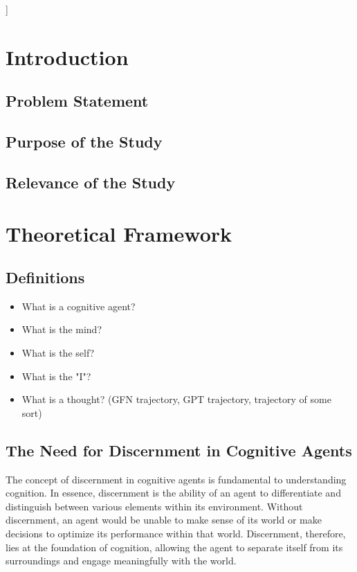 \documentclass[twocolumn]{article}
\begin{document}
]
\clearpage


\begin{abstract}

\end{abstract}

\tableofcontents

\section{Introduction}


\subsection{Problem Statement}


\subsection{Purpose of the Study}
\subsection{Relevance of the Study}

\section{Theoretical Framework}
\subsection{Definitions}
\begin{itemize}
        \item What is a cognitive agent?
        \item What is the mind?
        \item What is the self?
        \item What is the "I"?
        \item What is a thought? (GFN trajectory, GPT trajectory, trajectory of some sort)
\end{itemize}
\subsection{The Need for Discernment in Cognitive Agents}
The concept of discernment in cognitive agents is fundamental to understanding cognition. In essence, discernment is the ability of an agent to differentiate and distinguish between various elements within its environment. Without discernment, an agent would be unable to make sense of its world or make decisions to optimize its performance within that world. Discernment, therefore, lies at the foundation of cognition, allowing the agent to separate itself from its surroundings and engage meaningfully with the world.
\end{document}

